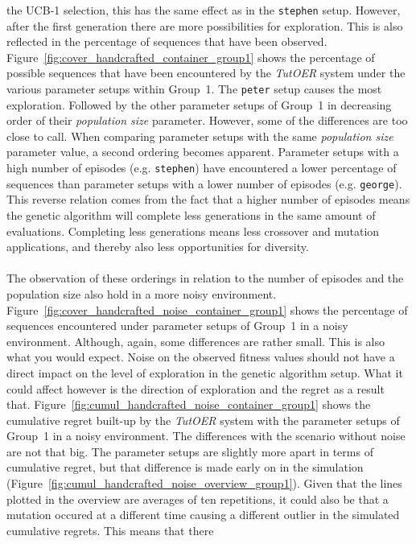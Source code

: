the UCB-1 selection, this has the same effect as in the \texttt{stephen} setup.
However, after the first generation there are more possibilities for
exploration. This is also reflected in the percentage of sequences that have
been observed. Figure~\ref{fig:cover_handcrafted_container_group1}
shows the percentage of possible sequences that have been encountered by the
\emph{TutOER} system under the various parameter setups within Group~1. The
\texttt{peter} setup causes the most exploration. Followed by the other
parameter setups of Group~1 in decreasing order of their \emph{population size}
parameter. However, some of the differences are too close to call. When comparing
parameter setups with the same \emph{population size} parameter value, a second
ordering becomes apparent. Parameter setups with a
high number of episodes (e.g. \texttt{stephen}) have encountered a lower percentage of sequences than
parameter setups with a lower number of episodes (e.g. \texttt{george}). This
reverse relation comes from the fact that a higher number of episodes means
the genetic algorithm will complete less generations in the same amount of
evaluations. Completing less generations means less crossover and mutation
applications, and thereby also less opportunities for diversity.\\\\
\noindent
The observation of these orderings in relation to the number of episodes and
the population size also hold in a more noisy environment.
Figure~\ref{fig:cover_handcrafted_noise_container_group1} shows the
percentage of sequences encountered under parameter setups of Group~1 in a
noisy environment. Although, again, some differences are rather small. This is
also what you would expect. Noise on the observed fitness values should not
have a direct impact on the level of exploration in the genetic algorithm
setup. What it could affect however is the direction of exploration and the
regret as a result that.
Figure~\ref{fig:cumul_handcrafted_noise_container_group1} shows the
cumulative regret built-up by the \emph{TutOER} system with the parameter
setups of Group~1 in a noisy environment. The differences with the scenario
without noise are not that big. The parameter setups are slightly more apart in
terms of cumulative regret, but that difference is made early on in the
simulation (Figure~\ref{fig:cumul_handcrafted_noise_overview_group1}).
Given that the lines plotted in the overview are averages of ten repetitions,
it could also be that a mutation occured at a different time causing a
different outlier in the simulated cumulative regrets. This means that there

